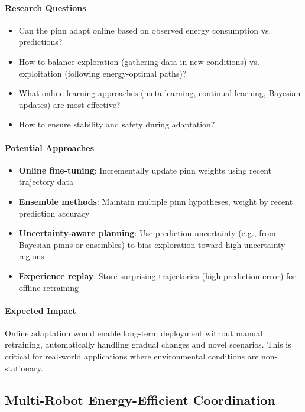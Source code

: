 \paragraph{Research Questions}
\begin{itemize}
    \item Can the \acrshort{pinn} adapt online based on observed energy consumption vs. predictions?
    \item How to balance exploration (gathering data in new conditions) vs. exploitation (following energy-optimal paths)?
    \item What online learning approaches (meta-learning, continual learning, Bayesian updates) are most effective?
    \item How to ensure stability and safety during adaptation?
\end{itemize}

\paragraph{Potential Approaches}
\begin{itemize}
    \item \textbf{Online fine-tuning}: Incrementally update \acrshort{pinn} weights using recent trajectory data
    \item \textbf{Ensemble methods}: Maintain multiple \acrshort{pinn} hypotheses, weight by recent prediction accuracy
    \item \textbf{Uncertainty-aware planning}: Use prediction uncertainty (e.g., from Bayesian \acrshort{pinn}s or ensembles) to bias exploration toward high-uncertainty regions
    \item \textbf{Experience replay}: Store surprising trajectories (high prediction error) for offline retraining
\end{itemize}

\paragraph{Expected Impact}
Online adaptation would enable long-term deployment without manual retraining, automatically handling gradual changes and novel scenarios. This is critical for real-world applications where environmental conditions are non-stationary.

\subsection{Multi-Robot Energy-Efficient Coordination}

